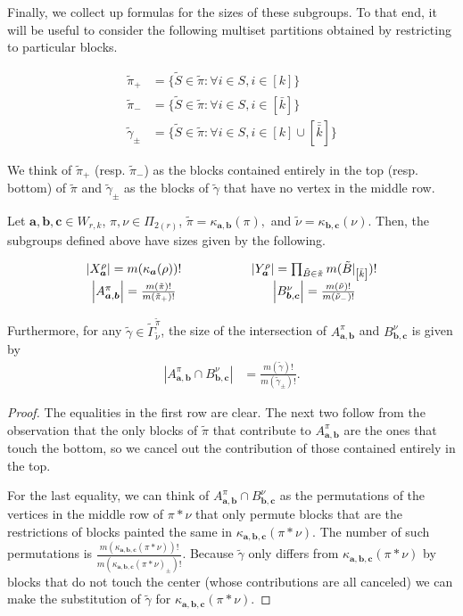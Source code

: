 \documentclass[ALCO,Unicode,published]{cedram}
\newcommand{\bfa}{{\boldsymbol{a}}}
\newcommand{\bfb}{{\boldsymbol{b}}}
\newcommand{\bfc}{{\boldsymbol{c}}}
\newcommand{\tpi}{{\tilde{\pi}}}
\newcommand{\tgamma}{{\tilde{\gamma}}}
\newcommand{\tnu}{{\tilde{\nu}}}
\newcommand{\tB}{{\tilde{B}}}
\newcommand{\tS}{{\tilde{S}}}
\newcommand{\ov}[1]{\bar{#1}}
\newcommand{\ovb}[1]{\left[\ov{#1}\right]}
\newcommand{\ovov}[1]{\bar{\bar{#1}}}
\newcommand{\ovovb}[1]{\left[\ovov{#1}\right]}
\newcommand{\abs}[1]{\left| #1\right |}
\begin{document}
Finally, we collect up formulas for the sizes of these subgroups. To that end, it will be useful to consider the following multiset partitions obtained by restricting to particular blocks.

\begin{align*}
    \tpi_+&=\{\tS\in\tpi:\forall i\in S,i\in[k]\}\\
    \tpi_-&=\{\tS\in\tpi:\forall i\in S,i\in\ovb{k}\}\\
    \tgamma_\pm&=\{\tS\in\tpi:\forall i\in S,i\in[k]\cup\ovovb{k}\}
\end{align*}

We think of $\tpi_+$ (resp. $\tpi_-$) as the blocks contained entirely in the top (resp. bottom) of $\tpi$ and $\tgamma_\pm$ as the blocks of $\tgamma$ that have no vertex in the middle row.

\begin{lemma}\label{lem:subgroup_sizes}
    Let $\bfa,\bfb,\bfc\in W_{r,k}$, $\pi,\nu\in\Pi_{2(r)}$, $\tpi=\kappa_{\bfa,\bfb}(\pi),$ and $\tnu=\kappa_{\bfb,\bfc}(\nu)$. Then, the subgroups defined above have sizes given by the following.

    \begin{align*}
        \begin{array}{ccc}
            \abs{X^\rho_\bfa}=m(\kappa_\bfa(\rho))! & \hspace{.5in} & \abs{Y^\rho_\bfa}=\prod_{\tB\in\tpi}m(\tB|_{\ovb{k}})! \\
            \abs{A^\pi_{\bfa,\bfb}}=\frac{m(\tpi)!}{m(\tpi_+)!} & & \abs{B^\nu_{\bfb,\bfc}}=\frac{m(\tnu)!}{m(\tnu_-)!}
        \end{array}
    \end{align*}

    Furthermore, for any $\tgamma\in\tilde\Gamma^\tpi_\tnu$, the size of the intersection of $A^\pi_{\bfa,\bfb}$ and $B^\nu_{\bfb,\bfc}$ is given by \begin{align*}
        \abs{A^\pi_{\bfa,\bfb}\cap B^\nu_{\bfb,\bfc}}&=\frac{m(\tgamma)!}{m(\tgamma_\pm)!}.
    \end{align*}
\end{lemma}

\begin{proof}
    The equalities in the first row are clear. The next two follow from the observation that the only blocks of $\tpi$ that contribute to $A_{\bfa,\bfb}^\pi$ are the ones that touch the bottom, so we cancel out the contribution of those contained entirely in the top.

    For the last equality, we can think of $A_{\bfa,\bfb}^\pi\cap B^\nu_{\bfb,\bfc}$ as the permutations of the vertices in the middle row of $\pi\ast\nu$ that only permute blocks that are the restrictions of blocks painted the same in $\kappa_{\bfa,\bfb,\bfc}(\pi\ast\nu)$. The number of such permutations is $\frac{m(\kappa_{\bfa,\bfb,\bfc}(\pi\ast\nu))!}{m(\kappa_{\bfa,\bfb,\bfc}(\pi\ast\nu)_\pm)!}$. Because $\tgamma$ only differs from $\kappa_{\bfa,\bfb,\bfc}(\pi\ast\nu)$ by blocks that do not touch the center (whose contributions are all canceled) we can make the substitution of $\tgamma$ for $\kappa_{\bfa,\bfb,\bfc}(\pi\ast\nu)$.
\end{proof}
\end{document}
